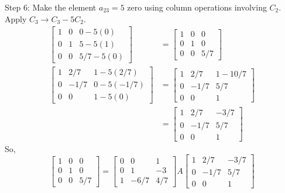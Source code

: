\documentclass{article}
\begin{document}
Step 6: Make the element $a_{23}=5$ zero using column operations involving $C_2$.
Apply $C_3 \to C_3 - 5C_2$.
\begin{align*} \begin{bmatrix} 1 & 0 & 0 - 5(0) \\ 0 & 1 & 5 - 5(1) \\ 0 & 0 & 5/7 - 5(0) \end{bmatrix} &= \begin{bmatrix} 1 & 0 & 0 \\ 0 & 1 & 0 \\ 0 & 0 & 5/7 \end{bmatrix} \\ \begin{bmatrix} 1 & 2/7 & 1 - 5(2/7) \\ 0 & -1/7 & 0 - 5(-1/7) \\ 0 & 0 & 1 - 5(0) \end{bmatrix} &= \begin{bmatrix} 1 & 2/7 & 1 - 10/7 \\ 0 & -1/7 & 5/7 \\ 0 & 0 & 1 \end{bmatrix} \\ &= \begin{bmatrix} 1 & 2/7 & -3/7 \\ 0 & -1/7 & 5/7 \\ 0 & 0 & 1 \end{bmatrix}\end{align*}
So,
\[ \begin{bmatrix} 1 & 0 & 0 \\ 0 & 1 & 0 \\ 0 & 0 & 5/7 \end{bmatrix} = \begin{bmatrix} 0 & 0 & 1 \\ 0 & 1 & -3 \\ 1 & -6/7 & 4/7 \end{bmatrix} A \begin{bmatrix} 1 & 2/7 & -3/7 \\ 0 & -1/7 & 5/7 \\ 0 & 0 & 1 \end{bmatrix} \]
\end{document}
